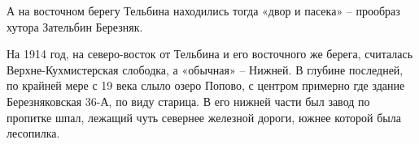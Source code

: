 А на восточном берегу Тельбина находились тогда «двор и пасека» – прообраз хутора Зательбин Березняк.

На 1914 год, на северо-восток от Тельбина и его восточного же берега, считалась Верхне-Кухмистерская слободка, а «обычная» – Нижней. В глубине последней, по крайней мере с 19 века слыло озеро Попово, с центром примерно где здание Березняковская 36-А, по виду старица. В его нижней части был завод по пропитке шпал, лежащий чуть севернее железной дороги, южнее которой была лесопилка.
